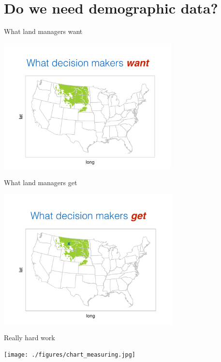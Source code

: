 \documentclass[14pt, compress, aspectratio=1610]{beamer}
\let\OldTexttt\texttt
\renewcommand{\texttt}[1]{\OldTexttt{\color{plTT}#1}}
\begin{document}
\hypertarget{do-we-need-demographic-data}{%
\section{Do we need demographic
data?}\label{do-we-need-demographic-data}}

\begin{frame}{%
\protect\hypertarget{what-land-managers-want}{%
What land managers want}}

\centering

\includegraphics[height=2.7in]{./figures/managers_want.pdf}

\end{frame}

\begin{frame}{%
\protect\hypertarget{what-land-managers-get}{%
What land managers get}}

\centering

\includegraphics[height=2.8in]{./figures/managers_get.pdf}

\end{frame}

\begin{frame}{%
\protect\hypertarget{really-hard-work}{%
Really hard work}}

\texttt{[image: ./figures/chart\_measuring.jpg]}

\end{frame}
\end{document}
